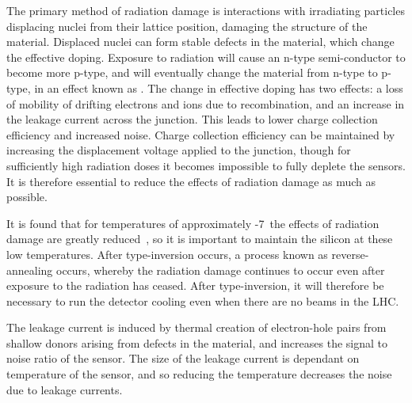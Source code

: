 The primary method
of radiation damage is interactions with irradiating particles displacing nuclei from
their lattice position, damaging the structure of the material. Displaced nuclei
can form stable defects in the material, which change the
effective doping. Exposure to radiation will cause an n-type
semi-conductor to become more p-type, and will eventually change the
material from n-type to p-type, in an effect known as .
The change in effective doping has two
effects: a loss of mobility of drifting electrons and ions due to recombination, and an increase in
the leakage current across the junction. This leads to lower charge collection
efficiency and increased noise. Charge
collection efficiency can be maintained by increasing the displacement voltage
applied to the junction, though for sufficiently high radiation doses it
becomes impossible to fully deplete the sensors. It is therefore essential to
reduce the effects of radiation damage as much as possible.
 

It is found that for temperatures of approximately -7\dc\ the effects of
radiation damage are greatly reduced~\cite{Lindstrom2001308}, so it is important
to maintain the silicon at these low temperatures. After type-inversion occurs,
a process known as reverse-annealing occurs, whereby the radiation damage
continues to occur even after exposure to the radiation has ceased. After type-inversion,
it will therefore be necessary to run the detector cooling even when there are no beams in
the LHC.

The leakage current is induced by thermal creation of electron-hole pairs from
shallow donors arising from defects in the material, and increases the signal to
noise ratio of the sensor. The size of the leakage current is dependant on
temperature of the sensor, and so reducing the temperature decreases the noise due to leakage
currents.

